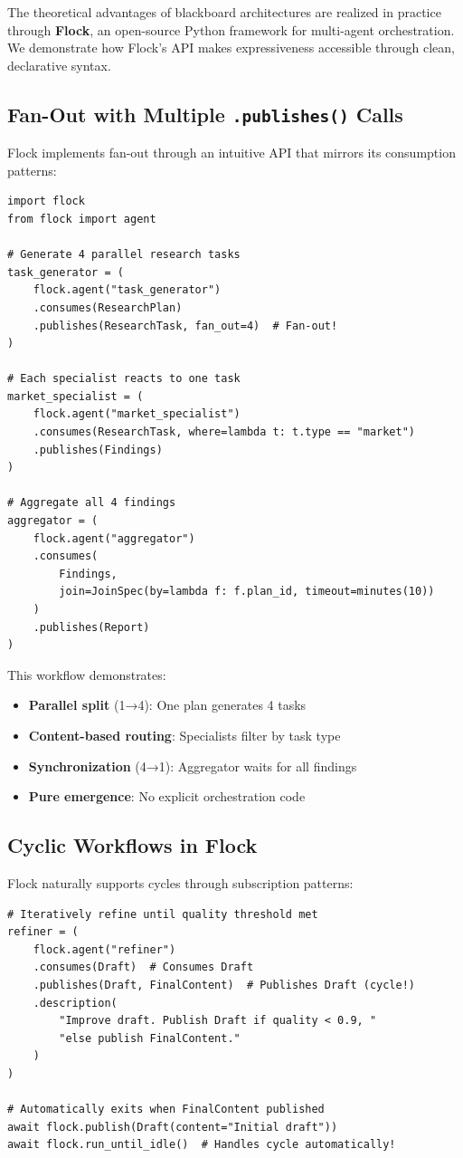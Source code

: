 \documentclass[11pt]{article}
\begin{document}
The theoretical advantages of blackboard architectures are realized in practice through \textbf{Flock}, an open-source Python framework for multi-agent orchestration. We demonstrate how Flock's API makes expressiveness accessible through clean, declarative syntax.

\subsection{Fan-Out with Multiple \texttt{.publishes()} Calls}

Flock implements fan-out through an intuitive API that mirrors its consumption patterns:

\begin{verbatim}
import flock
from flock import agent

# Generate 4 parallel research tasks
task_generator = (
    flock.agent("task_generator")
    .consumes(ResearchPlan)
    .publishes(ResearchTask, fan_out=4)  # Fan-out!
)

# Each specialist reacts to one task
market_specialist = (
    flock.agent("market_specialist")
    .consumes(ResearchTask, where=lambda t: t.type == "market")
    .publishes(Findings)
)

# Aggregate all 4 findings
aggregator = (
    flock.agent("aggregator")
    .consumes(
        Findings,
        join=JoinSpec(by=lambda f: f.plan_id, timeout=minutes(10))
    )
    .publishes(Report)
)
\end{verbatim}

This workflow demonstrates:
\begin{itemize}
    \item \textbf{Parallel split} (1→4): One plan generates 4 tasks
    \item \textbf{Content-based routing}: Specialists filter by task type
    \item \textbf{Synchronization} (4→1): Aggregator waits for all findings
    \item \textbf{Pure emergence}: No explicit orchestration code
\end{itemize}

\subsection{Cyclic Workflows in Flock}

Flock naturally supports cycles through subscription patterns:

\begin{verbatim}
# Iteratively refine until quality threshold met
refiner = (
    flock.agent("refiner")
    .consumes(Draft)  # Consumes Draft
    .publishes(Draft, FinalContent)  # Publishes Draft (cycle!)
    .description(
        "Improve draft. Publish Draft if quality < 0.9, "
        "else publish FinalContent."
    )
)

# Automatically exits when FinalContent published
await flock.publish(Draft(content="Initial draft"))
await flock.run_until_idle()  # Handles cycle automatically!
\end{verbatim}
\end{document}
